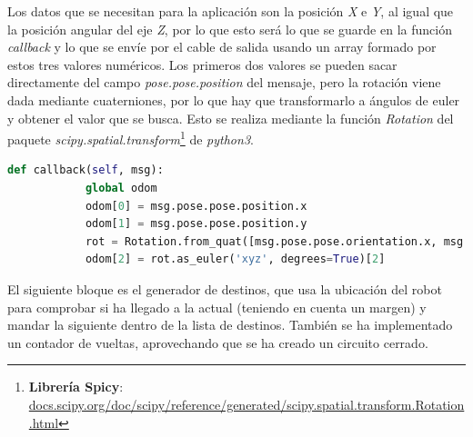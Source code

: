 Los datos que se necesitan para la aplicación son la posición \textit{X} e \textit{Y}, al igual que la posición angular del eje \textit{Z}, por lo que esto será lo que se guarde en la
función \textit{callback} y lo que se envíe por el cable de salida usando un array formado por estos tres valores numéricos. Los primeros dos valores se pueden sacar
directamente del campo \textit{pose.pose.position} del mensaje, pero la rotación viene dada mediante cuaterniones, por lo que hay que transformarlo a ángulos de euler y obtener
el valor que se busca. Esto se realiza mediante la función \textit{Rotation} del paquete
\textit{scipy.spatial.transform}\footnote{\textbf{Librería Spicy}: \url{docs.scipy.org/doc/scipy/reference/generated/scipy.spatial.transform.Rotation.html}}
de \textit{python3}.
\begin{code}[H]
    \begin{lstlisting}[language=python]
        def callback(self, msg):
            global odom
            odom[0] = msg.pose.pose.position.x
            odom[1] = msg.pose.pose.position.y
            rot = Rotation.from_quat([msg.pose.pose.orientation.x, msg.pose.pose.orientation.y, msg.pose.pose.orientation.z, msg.pose.pose.orientation.w])
            odom[2] = rot.as_euler('xyz', degrees=True)[2]
    \end{lstlisting}
    \caption[Funciones para obtener la fuerza repulsiva]{Funciones para obtener la fuerza repulsiva.}
    \label{cod:rep_vel}
\end{code}

El siguiente bloque es el generador de destinos, que usa la ubicación del robot para comprobar si ha llegado a la actual (teniendo en cuenta un margen) y mandar
la siguiente dentro de la lista de destinos. También se ha implementado un contador de vueltas, aprovechando que se ha creado un circuito cerrado.

